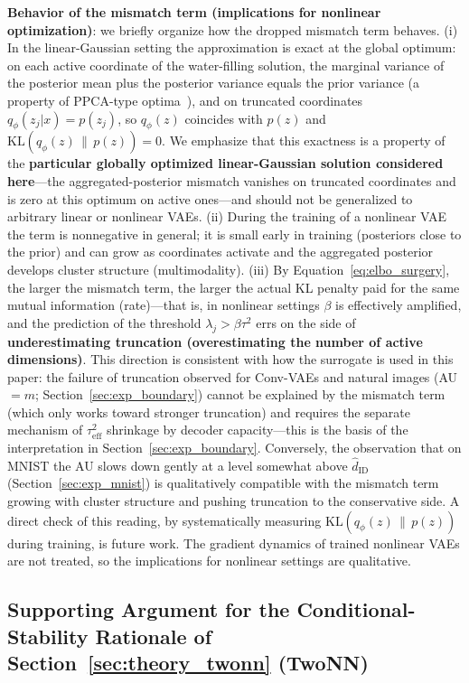 \documentclass[make,article,submit,pdftex,moreauthors]{Definitions/mdpi}
\newcommand{\hatdID}{\hat{d}_{\mathrm{ID}}}
\begin{document}
\textbf{Behavior of the mismatch term (implications for nonlinear
optimization)}:
we briefly organize how the dropped mismatch term behaves.
(i) In the linear-Gaussian setting the approximation is exact at the global
optimum: on each active coordinate of the water-filling solution, the
marginal variance of the posterior mean plus the posterior variance equals
the prior variance (a property of PPCA-type
optima~\cite{tippingbishop1999ppca,lucas2019elbo}), and on truncated
coordinates $q_\phi(z_j|x) = p(z_j)$, so $q_\phi(z)$ coincides with $p(z)$
and $\mathrm{KL}(q_\phi(z)\,\|\,p(z)) = 0$.
We emphasize that this exactness is a property of the \textbf{particular
globally optimized linear-Gaussian solution considered here}---the
aggregated-posterior mismatch vanishes on truncated coordinates and is zero
at this optimum on active ones---and should not be generalized to arbitrary
linear or nonlinear VAEs.
(ii) During the training of a nonlinear VAE the term is nonnegative in
general; it is small early in training (posteriors close to the prior) and
can grow as coordinates activate and the aggregated posterior develops
cluster structure (multimodality).
(iii) By Equation~\eqref{eq:elbo_surgery}, the larger the mismatch term,
the larger the actual KL penalty paid for the same mutual information
(rate)---that is, in nonlinear settings $\beta$ is effectively amplified,
and the prediction of the threshold $\lambda_j > \beta\tau^2$ errs on the
side of \textbf{underestimating truncation (overestimating the number of
active dimensions)}.
This direction is consistent with how the surrogate is used in this paper:
the failure of truncation observed for Conv-VAEs and natural images
(AU $= m$; Section~\ref{sec:exp_boundary}) cannot be explained by the
mismatch term (which only works toward stronger truncation) and requires
the separate mechanism of $\tau^2_{\mathrm{eff}}$ shrinkage by decoder
capacity---this is the basis of the interpretation in
Section~\ref{sec:exp_boundary}.
Conversely, the observation that on MNIST the AU slows down gently at a
level somewhat above $\hatdID$ (Section~\ref{sec:exp_mnist}) is
qualitatively compatible with the mismatch term growing with cluster
structure and pushing truncation to the conservative side.
A direct check of this reading, by systematically measuring
$\mathrm{KL}(q_\phi(z)\,\|\,p(z))$ during training, is future work.
The gradient dynamics of trained nonlinear VAEs are not treated, so the
implications for nonlinear settings are qualitative.

\subsection[\appendixname~\thesubsection]{Supporting Argument for the Conditional-Stability Rationale of Section~\ref{sec:theory_twonn} (TwoNN)}
\end{document}
